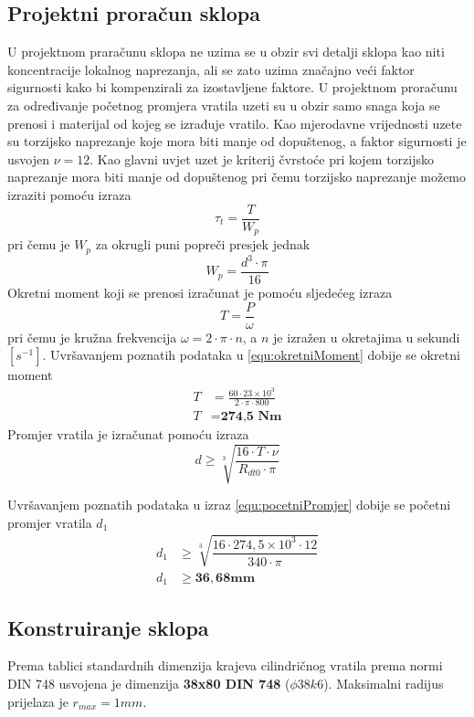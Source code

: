 \documentclass[12pt,a4paper]{article}
\begin{document}
\subsection{Projektni proračun sklopa}
U projektnom praračunu sklopa ne uzima se u obzir svi detalji sklopa kao niti koncentracije lokalnog naprezanja, ali se zato uzima značajno veći faktor sigurnosti kako bi kompenzirali za izostavljene faktore. U projektnom proračunu za određivanje početnog promjera vratila uzeti su u obzir samo snaga koja se prenosi i materijal od kojeg se izrađuje vratilo. Kao mjerodavne vrijednosti uzete su torzijsko naprezanje koje mora biti manje od dopuštenog, a faktor sigurnosti je usvojen $\nu=12$.
Kao glavni uvjet uzet je kriterij čvrstoće pri kojem torzijsko naprezanje mora biti manje od dopuštenog pri čemu torzijsko naprezanje možemo izraziti pomoću izraza
\begin{equation}
\tau_t=\dfrac{T}{W_p}\label{equ:tangencijalnoNaprezanje}
\end{equation}
pri čemu je $W_p$ za okrugli puni popreči presjek jednak
\begin{equation}
W_p=\frac{d^3 \cdot \pi}{16}
\end{equation}
Okretni moment koji se prenosi izračunat je pomoću sljedećeg izraza
\begin{equation}
T=\frac{P}{\omega}\label{equ:okretniMoment}
\end{equation}
pri čemu je kružna frekvencija $\omega=2 \cdot \pi \cdot n$, a $n$ je izražen u okretajima u sekundi $[s^{-1}]$.
Uvršavanjem poznatih podataka u \eqref{equ:okretniMoment} dobije se okretni moment
\begin{align*}
T&=\frac{60 \cdot 23\times 10^3}{2 \cdot \pi \cdot 800}\\
T&=\textbf{274,5 Nm}
\end{align*}
Promjer vratila je izračunat pomoću izraza
\begin{equation}
d \geq \sqrt[3]{\dfrac{16 \cdot T \cdot \nu}{R_{dt0} \cdot \pi}} \label{equ:pocetniPromjer}
\end{equation}

Uvršavanjem poznatih podataka u izraz \eqref{equ:pocetniPromjer} dobije se početni promjer vratila $d_1$
\begin{align*}
d_1&\geq \sqrt[3]{\dfrac{16 \cdot 274,5\times 10^3 \cdot 12}{340 \cdot \pi}}\\
d_1&\geq \mathbf{36,68 mm} 
\end{align*}

\subsection{Konstruiranje sklopa}
Prema tablici standardnih dimenzija krajeva cilindričnog vratila prema normi DIN 748 usvojena je dimenzija \textbf{38x80 DIN 748} ($\phi38k6$). Maksimalni radijus prijelaza je $r_{max}=1 mm$.
\end{document}
